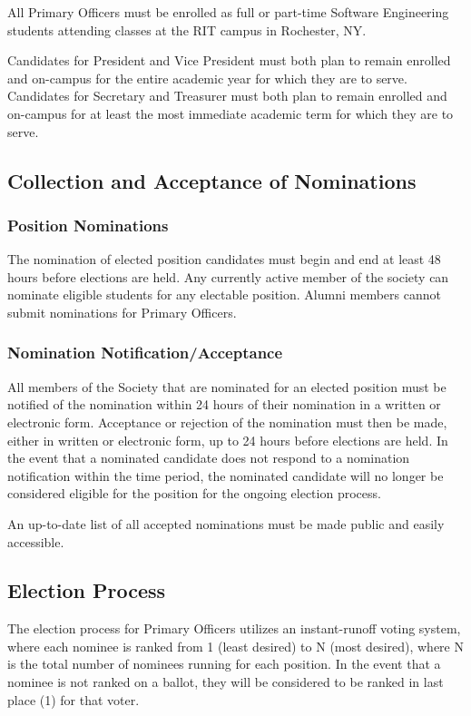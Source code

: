 \documentclass[american]{article}
\begin{document}
All Primary Officers must be enrolled as full or part-time Software Engineering students attending classes at the RIT campus in Rochester, NY.

Candidates for President and Vice President must both plan to remain enrolled and on-campus for the entire academic year for which they are to serve. Candidates for Secretary and Treasurer must both plan to remain enrolled and on-campus for at least the most immediate academic term for which they are to serve.

\subsection{Collection and Acceptance of Nominations}

\subsubsection{Position Nominations}
The nomination of elected position candidates must begin and end at least 48 hours before elections are held. Any currently active member of the society can nominate eligible students for any electable position. Alumni members cannot submit nominations for Primary Officers.

\subsubsection{Nomination Notification/Acceptance}
All members of the Society that are nominated for an elected position must be notified of the nomination within 24 hours of their nomination in a written or electronic form. Acceptance or rejection of the nomination must then be made, either in written or electronic form, up to 24 hours before elections are held. In the event that a nominated candidate does not respond to a nomination notification within the time period, the nominated candidate will no longer be considered eligible for the position for the ongoing election process.

An up-to-date list of all accepted nominations must be made public and easily accessible.

\subsection{Election Process}
The election process for Primary Officers utilizes an instant-runoff voting system, where each nominee is ranked from 1 (least desired) to N (most desired), where N is the total number of nominees running for each position. In the event that a nominee is not ranked on a ballot, they will be considered to be ranked in last place (1) for that voter.
\end{document}
